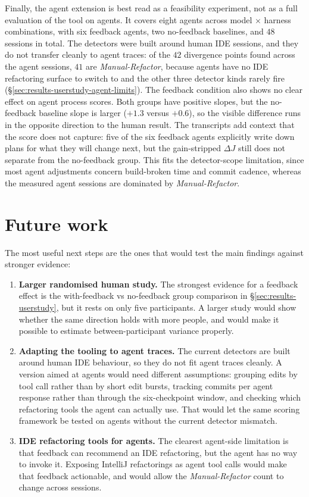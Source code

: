 Finally, the agent extension is best read as a feasibility experiment, not as a full evaluation of the tool on agents. It covers eight agents across model $\times$ harness combinations, with six feedback agents, two no-feedback baselines, and $48$ sessions in total. The detectors were built around human IDE sessions, and they do not transfer cleanly to agent traces: of the $42$ divergence points found across the agent sessions, $41$ are \emph{Manual-Refactor}, because agents have no IDE refactoring surface to switch to and the other three detector kinds rarely fire (\S\ref{sec:results-userstudy-agent-limits}). The feedback condition also shows no clear effect on agent process scores. Both groups have positive slopes, but the no-feedback baseline slope is larger ($+1.3$ versus $+0.6$), so the visible difference runs in the opposite direction to the human result. The transcripts add context that the score does not capture: five of the six feedback agents explicitly write down plans for what they will change next, but the gain-stripped $\Delta J$ still does not separate from the no-feedback group. This fits the detector-scope limitation, since most agent adjustments concern build-broken time and commit cadence, whereas the measured agent sessions are dominated by \emph{Manual-Refactor}.

\section{Future work}
\label{sec:conclusion-future-work}

The most useful next steps are the ones that would test the main findings against stronger evidence:

\begin{enumerate}
    \item \textbf{Larger randomised human study.} The strongest evidence for a feedback effect is the with-feedback vs no-feedback group comparison in \S\ref{sec:results-userstudy}, but it rests on only five participants. A larger study would show whether the same direction holds with more people, and would make it possible to estimate between-participant variance properly.

    \item \textbf{Adapting the tooling to agent traces.} The current detectors are built around human IDE behaviour, so they do not fit agent traces cleanly. A version aimed at agents would need different assumptions: grouping edits by tool call rather than by short edit bursts, tracking commits per agent response rather than through the six-checkpoint window, and checking which refactoring tools the agent can actually use. That would let the same scoring framework be tested on agents without the current detector mismatch.

    \item \textbf{IDE refactoring tools for agents.} The clearest agent-side limitation is that feedback can recommend an IDE refactoring, but the agent has no way to invoke it. Exposing IntelliJ refactorings as agent tool calls would make that feedback actionable, and would allow the \emph{Manual-Refactor} count to change across sessions.
\end{enumerate}

